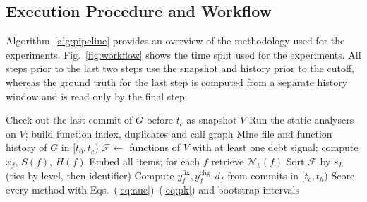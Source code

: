 \documentclass[12pt,onecolumn,draftclsnofoot]{IEEEtran}
\begin{document}
\subsection{Execution Procedure and Workflow}

Algorithm~\ref{alg:pipeline} provides an overview of the methodology used for the experiments. Fig.~\ref{fig:workflow} shows the time split used for the experiments. All steps prior to the last two steps use the snapshot and history prior to the cutoff, whereas the ground truth for the last step is computed from a separate history window and is read only by the final step.

\begin{algorithm}[!t]
\caption{Time-split debt prioritisation and refactoring}
\label{alg:pipeline}
Check out the last commit of $G$ before $t_c$ as snapshot $V$\;
Run the static analysers on $V$; build function index, duplicates and call graph\;
Mine file and function history of $G$ in $[t_0,t_c)$\;
$\mathcal{F}\leftarrow$ functions of $V$ with at least one debt signal; compute $x_f$, $S(f)$, $H(f)$\;
Embed all items; for each $f$ retrieve $\mathcal{N}_k(f)$\;
Sort $\mathcal{F}$ by $s_L$ (ties by level, then identifier)\;
Compute $y^{\mathrm{fix}}_f, y^{\mathrm{chg}}_f, d_f$ from commits in $[t_c,t_h)$\;
Score every method with Eqs.~(\ref{eq:auc})--(\ref{eq:pk}) and bootstrap intervals\;
\end{algorithm}
\end{document}
